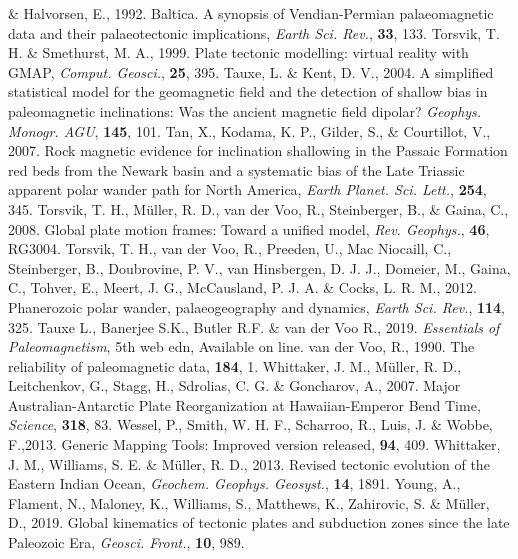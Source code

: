 \begin{thebibliography}{}
  \& Halvorsen, E., 1992. Baltica. A synopsis of Vendian-Permian palaeomagnetic
  data and their palaeotectonic implications, \textit{Earth Sci. Rev.},
  \textbf{33}, 133.
  Torsvik, T. H. \& Smethurst, M. A., 1999. Plate tectonic modelling: virtual
  reality with GMAP, \textit{Comput. Geosci.}, \textbf{25}, 395.
  Tauxe, L. \& Kent, D. V., 2004. A simplified statistical model for the
  geomagnetic field and the detection of shallow bias in paleomagnetic
  inclinations: Was the ancient magnetic field dipolar? \textit{Geophys.
  Monogr. AGU}, \textbf{145}, 101.
  Tan, X., Kodama, K. P., Gilder, S., \& Courtillot, V., 2007. Rock magnetic
  evidence for inclination shallowing in the Passaic Formation red beds from
  the Newark basin and a systematic bias of the Late Triassic apparent polar
  wander path for North America, \textit{Earth Planet. Sci. Lett.},
  \textbf{254}, 345.
  Torsvik, T. H., M{\"{u}}ller, R. D., van der Voo, R., Steinberger, B., \&
  Gaina, C., 2008. Global plate motion frames: Toward a unified model,
  \textit{Rev. Geophys.}, \textbf{46}, RG3004.
  Torsvik, T. H., van der Voo, R., Preeden, U., Mac Niocaill, C., Steinberger,
  B., Doubrovine, P. V., van Hinsbergen, D. J. J., Domeier, M., Gaina, C.,
  Tohver, E., Meert, J. G., McCausland, P. J. A. \& Cocks, L. R. M., 2012.
  Phanerozoic polar wander, palaeogeography and dynamics, \textit{Earth Sci.
  Rev.}, \textbf{114}, 325.
  Tauxe L., Banerjee S.K., Butler R.F. \& van der Voo R., 2019.
  \textit{Essentials of Paleomagnetism}, 5th web edn, Available on line.
  van der Voo, R., 1990. The reliability of paleomagnetic data,
  \tecto{}\textbf{184}, 1.
  Whittaker, J. M., M{\"{u}}ller, R. D., Leitchenkov, G., Stagg, H., Sdrolias,
  C. G. \& Goncharov, A., 2007. Major Australian-Antarctic Plate Reorganization
  at Hawaiian-Emperor Bend Time, \textit{Science}, \textbf{318},
  83.
  Wessel, P., Smith, W. H. F., Scharroo, R., Luis, J. \& Wobbe, F.,2013. Generic
  Mapping Tools: Improved version released, \eos{}\textbf{94}, 409.
  Whittaker, J. M., Williams, S. E. \& M{\"{u}}ller, R. D., 2013. Revised
  tectonic evolution of the Eastern Indian Ocean, \textit{Geochem. Geophys.
  Geosyst.}, \textbf{14}, 1891.
  Young, A., Flament, N., Maloney, K., Williams, S., Matthews, K., Zahirovic, S.
  \& M{\"{u}}ller, D., 2019. Global kinematics of tectonic plates and subduction
  zones since the late Paleozoic Era, \textit{Geosci. Front.},
  \textbf{10}, 989.
\end{thebibliography}

